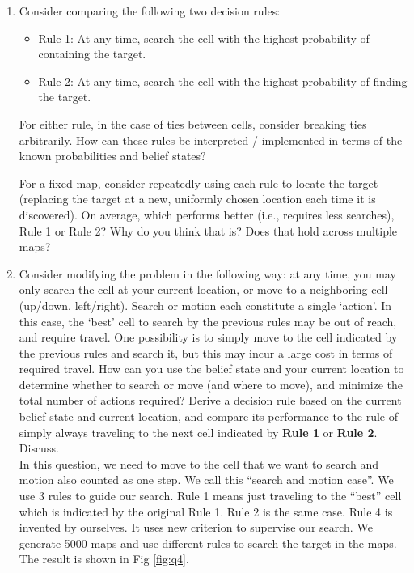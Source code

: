 \documentclass[letter]{article}
\begin{document}
\begin{enumerate}
	\item {Consider comparing the following two decision rules:
		\begin{itemize}
			\item {Rule 1: At any time, search the cell with the highest probability of containing the target.}
			\item {Rule 2: At any time, search the cell with the highest probability of finding the target.}
		\end{itemize} 
		\par{For either rule, in the case of ties between cells, consider breaking ties arbitrarily. How can these rules be interpreted / implemented in terms of the known probabilities and belief states?}
		\par{For a fixed map, consider repeatedly using each rule to locate the target (replacing the target at a new,
			uniformly chosen location each time it is discovered). On average, which performs better (i.e., requires less
			searches), Rule 1 or Rule 2? Why do you think that is? Does that hold across multiple maps?}
		}
	
	\item {Consider modifying the problem in the following way: at any time, you may only search the cell at your
		current location, or move to a neighboring cell (up/down, left/right). Search or motion each constitute a single
		`action'. In this case, the `best' cell to search by the previous rules may be out of reach, and require travel.
		One possibility is to simply move to the cell indicated by the previous rules and search it, but this may incur a
		large cost in terms of required travel. How can you use the belief state and your current location to determine
		whether to search or move (and where to move), and minimize the total number of actions required? Derive a
		decision rule based on the current belief state and current location, and compare its performance to the rule
		of simply always traveling to the next cell indicated by \textbf{Rule 1} or \textbf{Rule 2}. Discuss.} \\
	
	In this question, we need to move to the cell that we want to search and motion also
	counted as one step. We call this “search and motion case”. We use 3 rules to guide our
	search. Rule 1 means just traveling to the “best” cell which is indicated by the original
	Rule 1. Rule 2 is the same case. Rule 4 is invented by ourselves. It uses new criterion to
	supervise our search. We generate 5000 maps and use different rules to search the
	target in the maps. The result is shown in Fig \ref{fig:q4}.
	

\end{enumerate}
\end{document}
